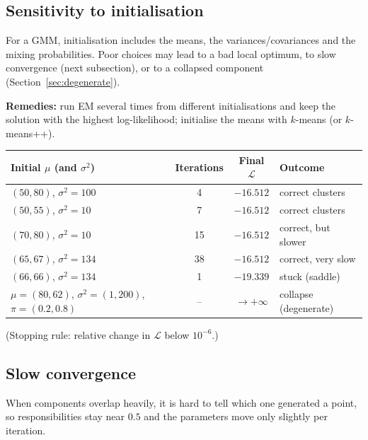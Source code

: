 \documentclass[11pt,a4paper]{article}
\newcommand{\LL}{\mathcal{L}}
\begin{document}
\subsection{Sensitivity to initialisation}

For a GMM, initialisation includes the means, the variances/covariances and the mixing probabilities. Poor choices may lead to a bad local optimum, to slow convergence (next subsection), or to a collapsed component (Section~\ref{sec:degenerate}).

\textbf{Remedies:} run EM several times from different initialisations and keep the solution with the highest log-likelihood; initialise the means with $k$-means (or $k$-means++).

\begin{center}
\begin{tabular}{@{}lccl@{}}
\toprule
Initial $\mu$ (and $\sigma^2$) & Iterations & Final $\LL$ & Outcome\\
\midrule
$(50,80)$, $\sigma^2=100$ & 4 & $-16.512$ & correct clusters\\
$(50,55)$, $\sigma^2=10$ & 7 & $-16.512$ & correct clusters\\
$(70,80)$, $\sigma^2=10$ & 15 & $-16.512$ & correct, but slower\\
$(65,67)$, $\sigma^2=134$ & 38 & $-16.512$ & correct, very slow\\
$(66,66)$, $\sigma^2=134$ & 1 & $-19.339$ & stuck (saddle)\\
$\mu=(80,62)$, $\sigma^2=(1,200)$, $\pi=(0.2,0.8)$ & -- & $\to+\infty$ & collapse (degenerate)\\
\bottomrule
\end{tabular}
\end{center}
(Stopping rule: relative change in $\LL$ below $10^{-6}$.)

\subsection{Slow convergence}

When components overlap heavily, it is hard to tell which one generated a point, so responsibilities stay near $0.5$ and the parameters move only slightly per iteration.
\end{document}
